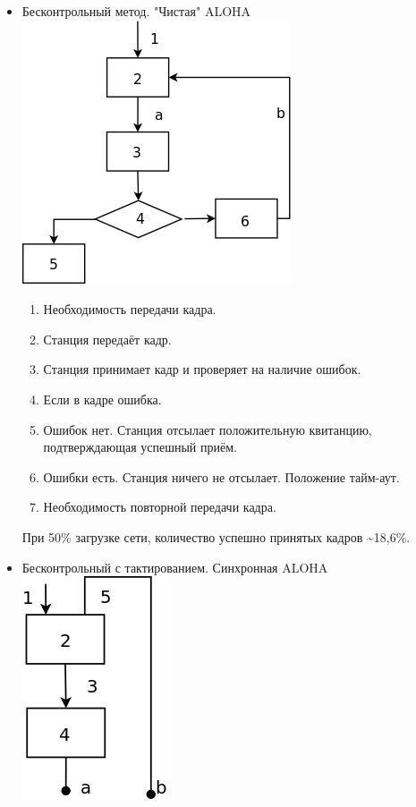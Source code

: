 \documentclass[12pt, russian, oneside, article]{ncc}
\begin{document}
\begin{itemize}

\item Бесконтрольный метод. "Чистая" ALOHA\\
\label{sec-5_1_1_1}%
\includegraphics[]{images/SiSPI/aloha.png}

\begin{enumerate}
\item Необходимость передачи кадра.
\item Станция передаёт кадр.
\item Станция принимает кадр и проверяет на наличие ошибок.
\item Если в кадре ошибка.
\item Ошибок нет. Станция отсылает положительную квитанцию, подтверждающая успешный приём.
\item Ошибки есть. Станция ничего не отсылает. Положение тайм-аут.
\item Необходимость повторной передачи кадра.
\end{enumerate}

При 50\% загрузке сети, количество успешно принятых кадров \~{}18,6\%.


\item Бесконтрольный с тактированием. Синхронная ALOHA\\
\label{sec-5_1_1_2}%
\includegraphics[]{images/SiSPI/sincaloha.png}


\end{itemize}
\end{document}

